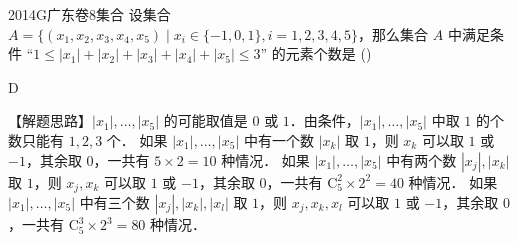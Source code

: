 
\begin{problem}{2014}{G}{广东卷}{8}{集合}
设集合 $ A = \{(x_1,x_2,x_3,x_4,x_5) \mid x_i \in \{-1,0,1\}, i = 1,2,3,4,5\} $，那么集合 $ A $ 中满足条件 “$ 1 \leqslant |x_1| + |x_2| + |x_3| + |x_4| + |x_5| \leqslant 3 $” 的元素个数是 (\hspace{1cm})
\begin{choices}
\end{choices}
\end{problem}

\begin{answer}
D
\end{answer}

\begin{solutions}
【解题思路】$ |x_1|,\dots,|x_5| $ 的可能取值是 $ 0 $ 或 $ 1 $．由条件，$ |x_1|,\dots,|x_5| $ 中取 $ 1 $ 的个数只能有 $ 1,2,3 $ 个．  
如果 $ |x_1|,\dots,|x_5| $ 中有一个数 $ |x_k| $ 取 $ 1 $，则 $ x_k $ 可以取 $ 1 $ 或 $ -1 $，其余取 $ 0 $，一共有 $ 5 \times 2 = 10 $ 种情况．  
如果 $ |x_1|,\dots,|x_5| $ 中有两个数 $ |x_j|,|x_k| $ 取 $ 1 $，则 $ x_j,x_k $ 可以取 $ 1 $ 或 $ -1 $，其余取 $ 0 $，一共有 $ \mathrm{C}_5^2 \times 2^2 = 40 $ 种情况．  
如果 $ |x_1|,\dots,|x_5| $ 中有三个数 $ |x_j|,|x_k|,|x_l| $ 取 $ 1 $，则 $ x_j,x_k,x_l $ 可以取 $ 1 $ 或 $ -1 $，其余取 $ 0 $，一共有 $ \mathrm{C}_5^3 \times 2^3 = 80 $ 种情况．
\end{solutions}